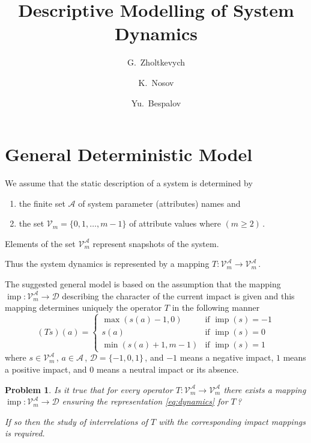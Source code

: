 \documentclass[11pt,reqno]{amsart}
\newtheorem{problem}{Problem}
\newcommand{\A}{\mathcal{A}}
\newcommand{\V}[1]{\mathcal{V}_{#1}}
\newcommand{\C}[1]{\mathcal{V}_{#1}^{\A}}
\newcommand{\imp}{\mathop{imp}}
\newcommand{\D}{\mathcal{D}}
\begin{document}
\title{Descriptive Modelling of System Dynamics}
\author{	G.~Zholtkevych\and K.~Nosov\and Yu.~Bespalov}
\address{%
	School of Mathematics and Computer Science,
	V.N.~Karazin Kharkiv National University,
	4 Svobody Sqr., 61022, Kharkiv, Ukraine
}
\maketitle
\begin{abstract}
\lipsum[13]
\end{abstract}
\tableofcontents
\section{General Deterministic Model}
We assume that the static description of a system is determined by
\begin{enumerate}
\item
the finite set $\A$ of system parameter (attributes) names and
\item
the set $\V{m}=\{0,1,\ldots,m-1\}$ of attribute values where $(m\geq 2)$\,.
\end{enumerate}

Elements of the set $\C{m}$ represent snapshots of the system.

Thus the system dynamics is represented by a mapping $T\colon\C{m}\to\C{m}$\,.

The suggested general model is based on the assumption that the mapping $\imp\colon\C{m}\to\D$ describing the character of the current impact is given and this mapping determines uniquely the operator $T$ in the following manner
\begin{equation}\label{eq:dynamics}
	(Ts)(a)=\left\lbrace\begin{array}{ll}
		\max(s(a)-1,0) & \text{if }\imp(s)=-1\\
		s(a) & \text{if }\imp(s)=0\\
		\min(s(a)+1,m-1) & \text{if }\imp(s)=1
	\end{array}
	\right.
\end{equation}
where $s\in\C{m}$\,, $a\in\A$\,, $\D=\{-1,0,1\}$\,, and $-1$ means a negative impact, $1$ means a positive impact, and $0$ means a neutral impact or its absence.
\begin{problem}
Is it true that for every operator $T\colon\C{m}\to\C{m}$ there exists a mapping $\imp\colon\C{m}\to\D$ ensuring the representation \eqref{eq:dynamics} for $T$\,?
\par\noindent
If so then the study of interrelations of $T$ with the corresponding impact mappings is required.
\end{problem}
\end{document}
